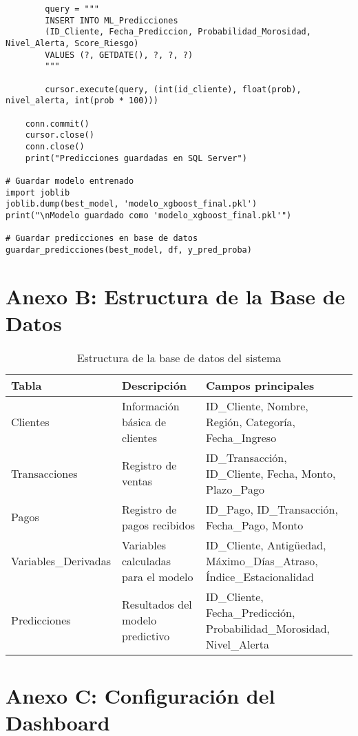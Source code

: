\begin{verbatim}
        query = """
        INSERT INTO ML_Predicciones 
        (ID_Cliente, Fecha_Prediccion, Probabilidad_Morosidad, Nivel_Alerta, Score_Riesgo)
        VALUES (?, GETDATE(), ?, ?, ?)
        """
        
        cursor.execute(query, (int(id_cliente), float(prob), nivel_alerta, int(prob * 100)))
    
    conn.commit()
    cursor.close()
    conn.close()
    print("Predicciones guardadas en SQL Server")

# Guardar modelo entrenado
import joblib
joblib.dump(best_model, 'modelo_xgboost_final.pkl')
print("\nModelo guardado como 'modelo_xgboost_final.pkl'")

# Guardar predicciones en base de datos
guardar_predicciones(best_model, df, y_pred_proba)
\end{verbatim}

\section{Anexo B: Estructura de la Base de Datos}

\begin{table}[ht]
\centering
\begin{tabular}{|p{4cm}|p{3cm}|p{7cm}|}
\hline
\textbf{Tabla} & \textbf{Descripción} & \textbf{Campos principales} \\
\hline
Clientes & Información básica de clientes & ID\_Cliente, Nombre, Región, Categoría, Fecha\_Ingreso \\
\hline
Transacciones & Registro de ventas & ID\_Transacción, ID\_Cliente, Fecha, Monto, Plazo\_Pago \\
\hline
Pagos & Registro de pagos recibidos & ID\_Pago, ID\_Transacción, Fecha\_Pago, Monto \\
\hline
Variables\_Derivadas & Variables calculadas para el modelo & ID\_Cliente, Antigüedad, Máximo\_Días\_Atraso, Índice\_Estacionalidad \\
\hline
Predicciones & Resultados del modelo predictivo & ID\_Cliente, Fecha\_Predicción, Probabilidad\_Morosidad, Nivel\_Alerta \\
\hline
\end{tabular}
\caption{Estructura de la base de datos del sistema}
\end{table}

\section{Anexo C: Configuración del Dashboard}

